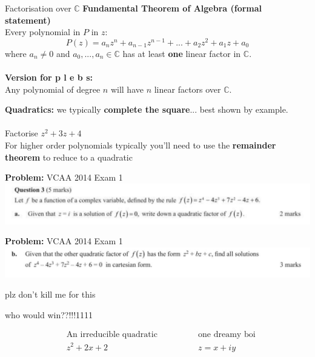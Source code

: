 \documentclass{beamer}
\begin{document}
\begin{frame}{Factorisation over $\mathbb{C}$}
	\textbf{Fundamental Theorem of Algebra (formal statement)}\\
	Every polynomial in $P$ in $z$:
	$$P(z) = a_n z^n + a_{n-1}z^{n-1} + ... + a_2 z^2 + a_1 z + a_0$$
	where $a_n \ne 0$ and $a_0, ..., a_n \in \mathbb{C}$ has at least \textbf{one} linear factor in $\mathbb{C}$.
	\\~\\
	\textbf{Version for p l e b s:}\\
	Any polynomial of degree $n$ will have $n$ linear factors over $\mathbb{C}$.
\end{frame}

\begin{frame}
	\textbf{Quadratics: } we typically \textbf{complete the square}... best shown by example.
	\\~\\
	Factorise $z^2 + 3z + 4$
	\vspace{5cm}
	\\
	For higher order polynomials typically you'll need to use the \textbf{remainder theorem} to reduce to a quadratic
\end{frame}

\begin{frame}
	\textbf{Problem: } VCAA 2014 Exam 1
	\includegraphics[width=\linewidth]{img/q3a.png}
	\vspace{4cm}
\end{frame}

\begin{frame}
	\textbf{Problem: } VCAA 2014 Exam 1
	\includegraphics[width=\linewidth]{img/q3b.png}
	\vspace{4cm}
\end{frame}

\begin{frame}{plz don't kill me for this}
	\begin{center} who would win??!!!1111 \end{center}

	\begin{align*}
		&\text{An irreducible quadratic}\quad\quad\quad\quad&\text{one dreamy boi}\\
		& z^2 + 2x + 2 & z = x + iy
	\end{align*}	
\end{frame}
\end{document}
